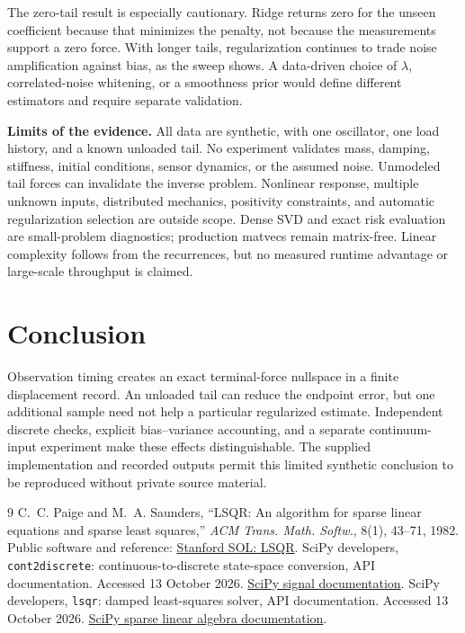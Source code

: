 \documentclass[10pt,a4paper]{article}
\begin{document}
The zero-tail result is especially cautionary. Ridge returns zero for the
unseen coefficient because that minimizes the penalty, not because the
measurements support a zero force. With longer tails, regularization continues
to trade noise amplification against bias, as the sweep shows. A data-driven
choice of $\lambda$, correlated-noise whitening, or a smoothness prior would
define different estimators and require separate validation.

\textbf{Limits of the evidence.} All data are synthetic, with one oscillator,
one load history, and a known unloaded tail. No experiment validates mass,
damping, stiffness, initial conditions, sensor dynamics, or the assumed noise.
Unmodeled tail forces can invalidate the inverse problem. Nonlinear response,
multiple unknown inputs, distributed mechanics, positivity constraints, and
automatic regularization selection are outside scope. Dense SVD and exact
risk evaluation are small-problem diagnostics; production matvecs remain
matrix-free. Linear complexity follows from the recurrences, but no measured
runtime advantage or large-scale throughput is claimed.

\section{Conclusion}
Observation timing creates an exact terminal-force nullspace in a finite
displacement record. An unloaded tail can reduce the endpoint error, but
one additional sample need not help a particular regularized estimate.
Independent discrete checks, explicit bias--variance accounting, and a
separate continuum-input experiment make these effects distinguishable.
The supplied implementation and recorded outputs permit this limited
synthetic conclusion to be reproduced without private source material.

\begin{thebibliography}{9}\small
{} C.~C. Paige and M.~A. Saunders, ``LSQR: An algorithm for sparse
linear equations and sparse least squares,'' \emph{ACM Trans. Math. Softw.},
8(1), 43--71, 1982. Public software and reference:
\href{https://web.stanford.edu/group/SOL/software/lsqr/}{Stanford SOL: LSQR}.
 SciPy developers, \texttt{cont2discrete}: continuous-to-discrete
state-space conversion, API documentation. Accessed 13 October 2026.
\href{https://docs.scipy.org/doc/scipy/reference/generated/scipy.signal.cont2discrete.html}{SciPy signal documentation}.
 SciPy developers, \texttt{lsqr}: damped least-squares solver,
API documentation. Accessed 13 October 2026.
\href{https://docs.scipy.org/doc/scipy/reference/generated/scipy.sparse.linalg.lsqr.html}{SciPy sparse linear algebra documentation}.
\end{thebibliography}
\end{document}
